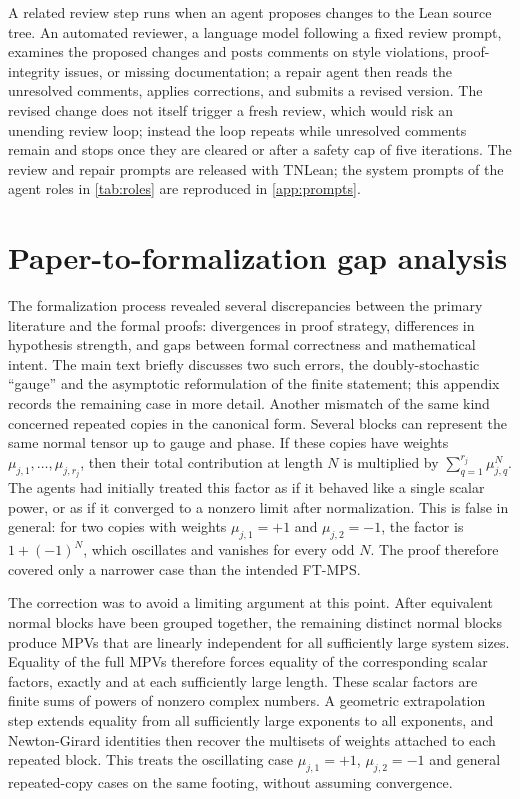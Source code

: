 A related review step runs when an agent proposes changes to the Lean source tree. An automated reviewer, a language model following a fixed review prompt, examines the proposed changes and posts comments on style violations, proof-integrity issues, or missing documentation; a repair agent then reads the unresolved comments, applies corrections, and submits a revised version. The revised change does not itself trigger a fresh review, which would risk an unending review loop; instead the loop repeats while unresolved comments remain and stops once they are cleared or after a safety cap of five iterations. The review and repair prompts are released with TNLean; the system prompts of the agent roles in \cref{tab:roles} are reproduced in \cref{app:prompts}.


\section{Paper-to-formalization gap analysis}\label{app:gaps}


The formalization process revealed several discrepancies between the primary literature and the formal proofs: divergences in proof strategy, differences in hypothesis strength, and gaps between formal correctness and mathematical intent.
The main text briefly discusses two such errors, the doubly-stochastic ``gauge'' and the asymptotic reformulation of the finite statement; this appendix records the remaining case in more detail.
Another mismatch of the same kind concerned repeated copies in the canonical form. Several blocks can represent the same normal tensor up to gauge and phase. If these copies have weights $\mu_{j,1},\ldots,\mu_{j,r_j}$, then their total contribution at length $N$ is multiplied by
$\sum_{q=1}^{r_j}\mu_{j,q}^N$.
The agents had initially treated this factor as if it behaved like a single scalar power, or as if it converged to a nonzero limit after normalization. This is false in general: for two copies with weights $\mu_{j,1}=+1$ and $\mu_{j,2}=-1$, the factor is $1+{(-1)}^N$, which oscillates and vanishes for every odd $N$. The proof therefore covered only a narrower case than the intended FT-MPS\@.

The correction was to avoid a limiting argument at this point. After equivalent normal blocks have been grouped together, the remaining distinct normal blocks produce MPVs that are linearly independent for all sufficiently large system sizes. Equality of the full MPVs therefore forces equality of the corresponding scalar factors, exactly and at each sufficiently large length. These scalar factors are finite sums of powers of nonzero complex numbers. A geometric extrapolation step extends equality from all sufficiently large exponents to all exponents, and Newton-Girard identities then recover the multisets of weights attached to each repeated block. This treats the oscillating case $\mu_{j,1}=+1$, $\mu_{j,2}=-1$ and general repeated-copy cases on the same footing, without assuming convergence.








